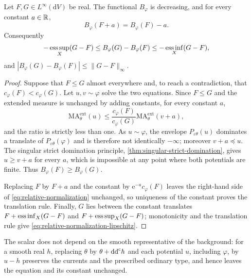 \begin{proposition}\label{prop:relative-normalization-order}
Let $F,G\in L^\infty(\mathrm{d}V)$ be real. The functional $B_\varphi$ is decreasing, and for every constant $a\in\mathbb R$,
\[
 B_\varphi(F+a)=B_\varphi(F)-a.
\]
Consequently
\begin{equation}\label{eq:relative-normalization-lipschitz}
 -\mathop{\rm ess\,sup}_X(G-F)
 \leq B_\varphi(G)-B_\varphi(F)
 \leq-\mathop{\rm ess\,inf}_X(G-F),
\end{equation}
and $|B_\varphi(G)-B_\varphi(F)|\leq\|G-F\|_\infty$.
\end{proposition}
\begin{proof}
Suppose that $F\leq G$ almost everywhere and, to reach a contradiction, that $c_\varphi(F)<c_\varphi(G)$. Let $u,v\sim\varphi$ solve the two equations. Since $F\leq G$ and the extended measure is unchanged by adding constants, for every constant $a$,
\[
 \mathrm{MA}^{\mathrm{ext}}_\theta(u)
 \leq\frac{c_\varphi(F)}{c_\varphi(G)}
             \mathrm{MA}^{\mathrm{ext}}_\theta(v+a),
\]
and the ratio is strictly less than one. As $u\sim\varphi$, the envelope $P_{\varepsilon\theta}(u)$ dominates a translate of $P_{\varepsilon\theta}(\varphi)$ and is therefore not identically $-\infty$; moreover $v+a\preceq u$. The singular strict domination principle, \cref{thm:singular-strict-domination}, gives $u\geq v+a$ for every $a$, which is impossible at any point where both potentials are finite. Thus $B_\varphi(F)\geq B_\varphi(G)$.

Replacing $F$ by $F+a$ and the constant by $\mathrm{e}^{-a}c_\varphi(F)$ leaves the right-hand side of \eqref{eq:relative-normalization} unchanged, so uniqueness of the constant proves the translation rule. Finally, $G$ lies between the constant translates $F+\mathop{\rm ess\,inf}_X(G-F)$ and $F+\mathop{\rm ess\,sup}_X(G-F)$; monotonicity and the translation rule give \eqref{eq:relative-normalization-lipschitz}.
\end{proof}

The scalar does not depend on the smooth representative of the background: for a smooth real $h$, replacing $\theta$ by $\theta+\mathrm{dd}^{\mathrm{c}} h$ and each potential $u$, including $\varphi$, by $u-h$ preserves the currents and the prescribed ordinary type, and hence leaves the equation and its constant unchanged.

